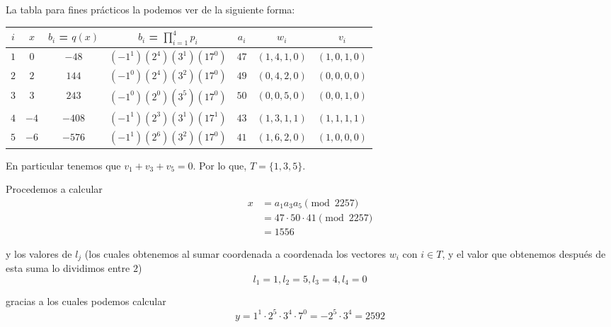 \documentclass[letterpaper,11pt]{article}
\begin{document}
\begin{enumerate}
\begin{enumerate}
        La tabla para fines prácticos la podemos ver de la siguiente forma:
         \begin{center}
            \begin{tabular}{|c|c|c|c|c|c|c|} 
            \hline
            $i$ & $x$ & $b_{i}$ = $q(x)$ & $b_{i}$ = $\prod_{i=1}^{4} p_{i}$ & 
            $a_{i}$ & $w_{i}$ & $v_{i}$ \\ \hline
            $1$ & $0$ & $-48$ & $(-1^1)(2^4)(3^1)(17^0)$ & $47$ & $(1,4,1,0)$ &
            $(1,0,1,0)$ \\ \hline
            $2$ & $2$ & $144$ & $(-1^0)(2^4)(3^2)(17^0)$ & $49$ & $(0,4,2,0)$ & 
            $(0,0,0,0)$ \\ \hline
            $3$ & $3$ & $243$ & $(-1^0)(2^0)(3^5)(17^0)$ & $50$ & $(0,0,5,0)$ & 
            $(0,0,1,0)$ \\ \hline
            $4$ & $-4$ & $-408$ & $(-1^1)(2^3)(3^1)(17^1)$ & $43$ & $(1,3,1,1)$ & 
            $(1,1,1,1)$ \\ \hline
            $5$ & $-6$ & $-576$ & $(-1^1)(2^6)(3^2)(17^0)$ & $41$ & $(1,6,2,0)$ & 
            $(1,0,0,0)$ \\ \hline
            \end{tabular}
        \end{center}
        
        En particular tenemos que $v_{1} + v_{3} + v_{5} = 0$. Por lo que, 
        $T = \{1, 3, 5\}$.
        
        Procedemos a calcular
        \begin{align*}
            x 
            &= a_{1} a_{3} a_{5} \pmod{2257} \\
            &= 47 \cdot 50 \cdot 41 \pmod{2257} \\
            &= 1556
        \end{align*}
        
        y los valores de $l_{j}$ (los cuales obtenemos al sumar coordenada a
        coordenada los vectores $w_{i}$ con $i \in T$, y el valor que obtenemos
        después de esta suma lo dividimos entre $2$)
        \begin{equation*}
            l_{1} = 1, l_{2} = 5, l_{3} = 4, l_{4} = 0
        \end{equation*}
        
        gracias a los cuales podemos calcular
        \begin{equation*}
            y = 1^{1} \cdot 2^{5} \cdot 3^{4} \cdot 7^{0} = 
            -2^{5} \cdot 3^{4} = 2592
        \end{equation*}
        

\end{enumerate}
\end{enumerate}
\end{document}
